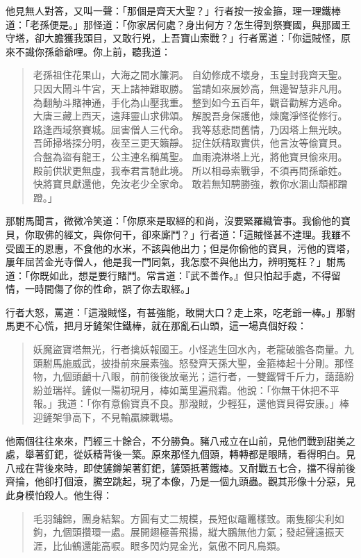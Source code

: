 他見無人對答，又叫一聲：「那個是齊天大聖？」行者按一按金箍，理一理鐵棒道：「老孫便是。」那怪道：「你家居何處？身出何方？怎生得到祭賽國，與那國王守塔，卻大膽獲我頭目，又敢行兇，上吾寶山索戰？」行者罵道：「你這賊怪，原來不識你孫爺爺哩。你上前，聽我道：
\begin{quote}
老孫祖住花果山，大海之間水簾洞。
自幼修成不壞身，玉皇封我齊天聖。
只因大鬧斗牛宮，天上諸神難取勝。
當請如來展妙高，無邊智慧非凡用。
為翻觔斗賭神通，手化為山壓我重。
整到如今五百年，觀音勸解方逃命。
大唐三藏上西天，遠拜靈山求佛頌。
解脫吾身保護他，煉魔淨怪從修行。
路逢西域祭賽城。屈害僧人三代命。
我等慈悲問舊情，乃因塔上無光映。
吾師掃塔探分明，夜至三更天籟靜。
捉住妖精取實供，他言汝等偷寶貝。
合盤為盜有龍王，公主連名稱萬聖。
血雨澆淋塔上光，將他寶貝偷來用。
殿前供狀更無虛，我奉君言馳此境。
所以相尋索戰爭，不須再問孫爺姓。
快將寶貝獻還他，免汝老少全家命。
敢若無知騁勝強，教你水涸山頹都蹭蹬。」
\end{quote}

那駙馬聞言，微微冷笑道：「你原來是取經的和尚，沒要緊羅織管事。我偷他的寶貝，你取佛的經文，與你何干，卻來廝鬥？」行者道：「這賊怪甚不達理。我雖不受國王的恩惠，不食他的水米，不該與他出力；但是你偷他的寶貝，污他的寶塔，屢年屈苦金光寺僧人，他是我一門同氣，我怎麼不與他出力，辨明冤枉？」駙馬道：「你既如此，想是要行賭鬥。常言道：『武不善作。』但只怕起手處，不得留情，一時間傷了你的性命，誤了你去取經。」

行者大怒，罵道：「這潑賊怪，有甚強能，敢開大口？走上來，吃老爺一棒。」那駙馬更不心慌，把月牙鏟架住鐵棒，就在那亂石山頭，這一場真個好殺：
\begin{quote}
妖魔盜寶塔無光，行者擒妖報國王。小怪逃生回水內，老龍破膽各商量。九頭駙馬施威武，披掛前來展素強。怒發齊天孫大聖，金箍棒起十分剛。那怪物，九個頭顱十八眼，前前後後放毫光；這行者，一雙鐵臂千斤力，藹藹紛紛並瑞祥。鏟似一陽初現月，棒如萬里遍飛霜。他說：「你無干休把不平報。」我道：「你有意偷寶真不良。那潑賊，少輕狂，還他寶貝得安康。」棒迎鏟架爭高下，不見輸贏練戰場。
\end{quote}

他兩個往往來來，鬥經三十餘合，不分勝負。豬八戒立在山前，見他們戰到甜美之處，舉著釘鈀，從妖精背後一築。原來那怪九個頭，轉轉都是眼睛，看得明白。見八戒在背後來時，即使鏟鐏架著釘鈀，鏟頭抵著鐵棒。又耐戰五七合，擋不得前後齊掄，他卻打個滾，騰空跳起，現了本像，乃是一個九頭蟲。觀其形像十分惡，見此身模怕殺人。他生得：
\begin{quote}
毛羽鋪錦，團身結絮。方圓有丈二規模，長短似黿鼉樣致。兩隻腳尖利如鉤，九個頭攢環一處。展開翅極善飛揚，縱大鵬無他力氣；發起聲遠振天涯，比仙鶴還能高唳。眼多閃灼晃金光，氣傲不同凡鳥類。
\end{quote}

